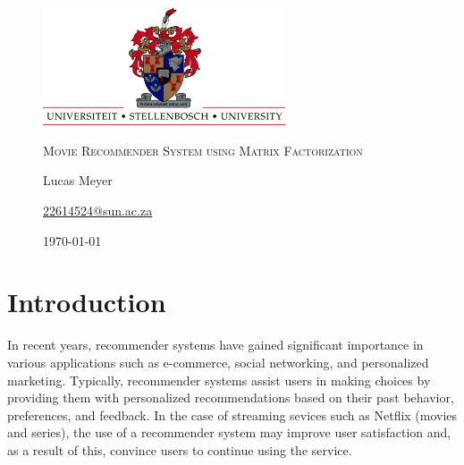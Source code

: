 \documentclass{article}
\begin{document}
\begin{figure}[h!]
    \centering
    \includegraphics[width=0.64\textwidth]{graphics/UScrest-top-eps-converted-to.pdf}\par\vspace{1cm}
    {\scshape\Large Movie Recommender System using Matrix Factorization\par}
    \vspace{0.75cm}
    {\Large Lucas Meyer\par}
    \vspace{0.05cm}
    {\normalsize \href{22614524@sun.ac.za}{22614524@sun.ac.za}\par}
    \vspace{0.05cm}
    {\normalsize \today\par}
    \vspace{0.7cm}
\end{figure}


\section{Introduction}
In recent years, recommender systems have gained significant importance in various applications
such as e-commerce, social networking, and personalized marketing. Typically, recommender systems assist
users in making choices by providing them with personalized recommendations based on their past
behavior, preferences, and feedback. In the case of streaming sevices such as Netflix (movies and series), 
the use of a recommender system may improve user satisfaction and, as a result of this, convince users to
continue using the service.
\end{document}
